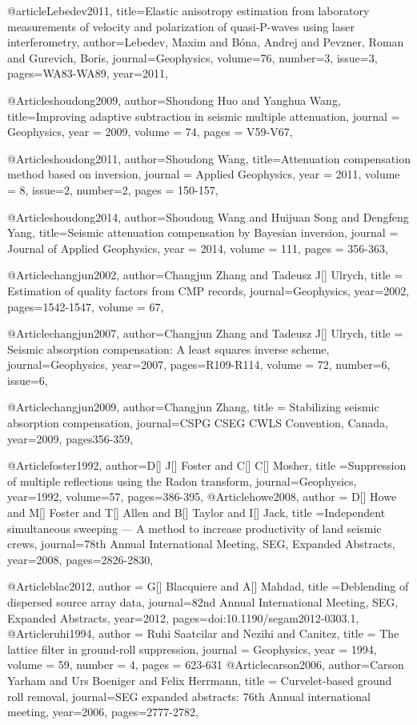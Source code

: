 @article{Lebedev2011,
  title={Elastic anisotropy estimation from laboratory measurements of velocity and polarization of quasi-P-waves using laser interferometry},
  author={Lebedev, Maxim and Bóna, Andrej and Pevzner, Roman and Gurevich, Boris},
  journal={Geophysics},
  volume={76},
  number={3},
  issue=3,
  pages={WA83-WA89},
  year={2011},
}

@Article{shoudong2009,
  author={Shoudong Huo and Yanghua Wang},
  title={Improving adaptive subtraction in seismic multiple attenuation},
  journal = 	 {Geophysics},
  year = 	 2009,
  volume =	 74,
  pages =	 {V59-V67},
}

@Article{shoudong2011,
  author={Shoudong Wang},
  title={Attenuation compensation method based on inversion},
  journal = 	 {Applied Geophysics},
  year = 	 2011,
  volume =	 8,
  issue=2,
  number=2,
  pages =	 {150-157},
}

@Article{shoudong2014,
  author={Shoudong Wang and Huijuan Song and Dengfeng Yang},
  title={Seismic attenuation compensation by Bayesian inversion},
  journal = 	 {Journal of Applied Geophysics},
  year = 	 2014,
  volume =	 111,
  pages =	 {356-363},
}

@Article{changjun2002,
  author={Changjun Zhang and Tadeusz J[] Ulrych},
  title = {Estimation of quality factors from CMP records},
  journal={Geophysics},
  year=2002,
  pages={1542-1547},
  volume = 67,
}

@Article{changjun2007,
  author={Changjun Zhang and Tadeusz J[] Ulrych},
  title = {Seismic absorption compensation: A least squares inverse scheme},
  journal={Geophysics},
  year=2007,
  pages={R109-R114},
  volume = 72,
  number=6,
  issue=6,
}

@Article{changjun2009,
  author={Changjun Zhang},
  title = {Stabilizing seismic absorption compensation},
  journal={CSPG CSEG CWLS Convention, Canada},
  year=2009,
  pages{356-359},
}



@Article{foster1992,
  author={D[] J[] Foster and C[] C[] Mosher},
  title ={Suppression of multiple reflections using the Radon transform},
  journal={Geophysics},
  year=1992,
  volume=57,
  pages={386-395},
}
@Article{howe2008,
  author = {D[] Howe and M[] Foster and T[] Allen and B[] Taylor and I[] Jack},
  title ={Independent simultaneous sweeping — A
method to increase productivity of land seismic crews},
  journal={78th Annual International Meeting, SEG,
Expanded Abstracts},
  year=2008,
  pages={2826-2830},
}

@Article{blac2012,
  author = {G[] Blacquiere and A[] Mahdad},
  title ={Deblending of dispersed source array data},
  journal={82nd Annual International Meeting, SEG, Expanded Abstracts},
  year=2012,
  pages={doi:10.1190/segam2012-0303.1},
}
@Article{ruhi1994,
  author = 	 {Ruhi Saatcilar and Nezihi and Canitez},
  title = 	 {The lattice filter in ground-roll suppression},
  journal = 	 {Geophysics},
  year = 	 1994,
  volume = 	 59,
  number = 	 4,
  pages = 	 {623-631}}
@Article{carson2006,
  author={Carson Yarham and Urs Boeniger and Felix Herrmann},
  title = {Curvelet-based ground roll removal},
  journal={SEG expanded abstracts: 76th Annual international meeting},
  year=2006,
  pages={2777-2782},
}

